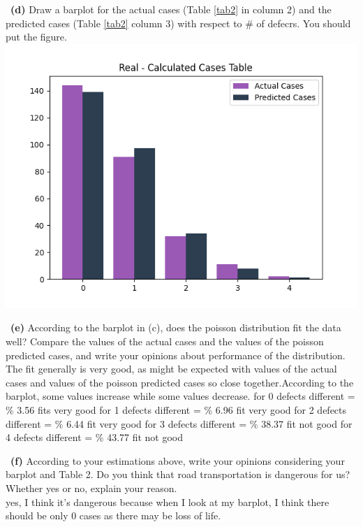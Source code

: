 \documentclass[a4 paper]{article}
\numberwithin{equation}{section}
\newcommand{\subproblem}[1]{~\newline\textbf{(#1)}}
\newcommand{\0}{\mathbf{0}}
\begin{document}
	\subproblem{d} Draw a barplot for the actual cases (Table \ref{tab2} in column 2) and the predicted cases (Table \ref{tab2} column 3) with respect to \# of defecrs. You should put the figure.\\
	\newline
	\includegraphics{barplot.png}
	
	\subproblem{e} According to the barplot in (c), does the poisson distribution fit the data well? Compare the values of the actual cases and the values of the poisson predicted cases, and write your opinions about performance of the distribution.\\
	\newline
	The fit  generally is very good, as might be expected with  values of the actual cases and values of the poisson predicted cases so close together.According to the barplot, some values increase while some values decrease.
	\newline
	for 0 defects different = \% 3.56  fits very good
	\newline
	for 1 defects different = \% 6.96  fit very good
	\newline
	for 2 defects different = \% 6.44  fit very good
	\newline
	for 3 defects different = \% 38.37 fit not good
	\newline
	for 4 defects different = \% 43.77 fit not good
	
	\subproblem{f} According to your estimations above, write your opinions considering your barplot and Table 2. Do you think that road transportation is dangerous for us? Whether yes or no, explain your reason.\\
	\newline
	yes, I think it's dangerous because when I look at my barplot, I think there should be only 0 cases as there may be loss of life.
	
\end{document}

